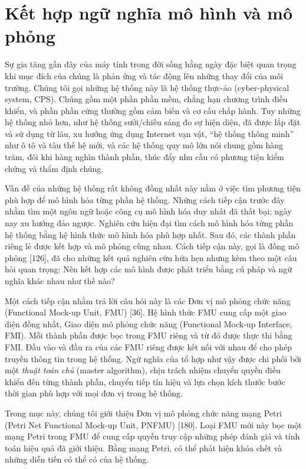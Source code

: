 \section{Kết hợp ngữ nghĩa mô hình và mô phỏng}
Sự gia tăng gần đây của máy tính trong đời sống hằng ngày đặc biệt quan trọng khi mục đích của chúng là phản ứng và tác động lên những thay đổi của môi trường. Chúng tôi gọi những hệ thống này là hệ thống thực-ảo (cyber-physical system, CPS). Chúng gồm một phần phần mềm, chẳng hạn chương trình điều khiển, và phần phần cứng thường gồm cảm biến và cơ cấu chấp hành. Tuy những hệ thống nhỏ hơn, như hệ thống sưởi/chiếu sáng đo sự hiện diện, đã được lắp đặt và sử dụng từ lâu, xu hướng ứng dụng Internet vạn vật, ``hệ thống thông minh'' như ô tô và tàu thế hệ mới, và các hệ thống quy mô lớn nói chung gồm hàng trăm, đôi khi hàng nghìn thành phần, thúc đẩy nhu cầu có phương tiện kiểm chứng và thẩm định chúng.

Vấn đề của những hệ thống rất không đồng nhất này nằm ở việc tìm phương tiện phù hợp để mô hình hóa từng phần hệ thống. Những cách tiếp cận trước đây nhằm tìm một ngôn ngữ hoặc công cụ mô hình hóa duy nhất đã thất bại; ngày nay xu hướng đảo ngược. Nghiên cứu hiện đại tìm cách mô hình hóa từng phần hệ thống bằng hệ hình thức mô hình hóa phù hợp nhất. Sau đó, các thành phần riêng lẻ được kết hợp và mô phỏng cùng nhau. Cách tiếp cận này, gọi là
đồng mô phỏng [126], đã cho những kết quả nghiên cứu hứa hẹn nhưng kèm theo một câu hỏi quan trọng: Nên kết hợp các mô hình được phát triển bằng cú pháp và ngữ nghĩa khác nhau như thế nào?

Một cách tiếp cận nhằm trả lời câu hỏi này là các Đơn vị mô phỏng chức năng (Functional Mock-up Unit, FMU) [36]. Hệ hình thức FMU cung cấp một giao diện đồng nhất, Giao diện mô phỏng chức năng (Functional Mock-up Interface, FMI). Mỗi thành phần được bọc trong FMU riêng và từ đó được thực thi bằng FMI. Đầu vào và đầu ra của các FMU riêng được kết nối với nhau để cho phép truyền thông tin trong hệ thống. Ngữ nghĩa của tổ hợp như vậy được chi phối bởi một \emph{thuật toán chủ} (master algorithm), chịu trách nhiệm chuyển quyền điều khiển đến từng thành phần, chuyển tiếp tín hiệu và lựa chọn kích thước bước thời gian phù hợp với mọi đơn vị trong hệ thống.

Trong mục này, chúng tôi giới thiệu Đơn vị mô phỏng chức năng mạng Petri (Petri Net Functional Mock-up Unit, PNFMU) [180]. Loại FMU mới này bọc một mạng Petri trong FMU để cung cấp quyền truy cập những phép đánh giá và tính toán hiệu quả đã giới thiệu. Bằng mạng Petri, có thể phát hiện khóa chết và những diễn tiến có thể có của hệ thống.

